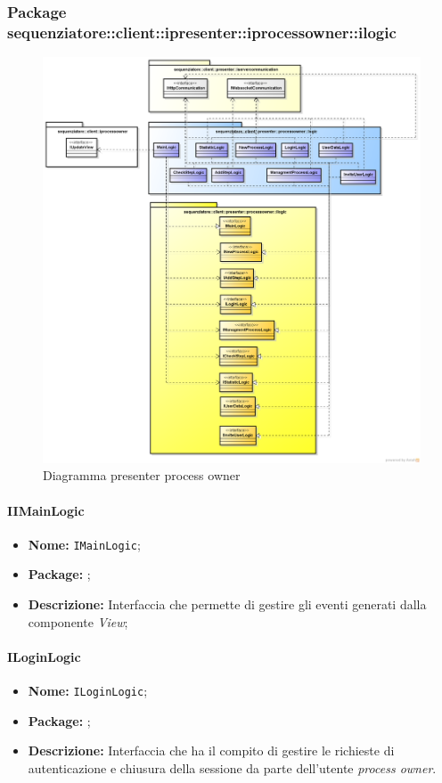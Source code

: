 \subsubsection{Package sequenziatore::client::ipresenter::iprocessowner::ilogic}
\begin{figure}[H] \centering \includegraphics[width=%
\textwidth]
{./pack/presenter_PO.png} \caption{Diagramma presenter process owner}
\end{figure}
\paragraph{IIMainLogic}
\begin{itemize}
\item \textbf{Nome:} \texttt{IMainLogic};
\item \textbf{Package:} \texttt{\iLogicAdmin{}};
\item \textbf{Descrizione:} Interfaccia che permette di gestire gli eventi generati dalla componente \textit{View};
\end{itemize}

\paragraph{ILoginLogic}
\begin{itemize}
\item \textbf{Nome:} \texttt{ILoginLogic};
\item \textbf{Package:} \texttt{\iLogicAdmin{}};
\item \textbf{Descrizione:} Interfaccia che ha il compito di gestire le richieste di autenticazione e chiusura della sessione da parte dell'utente \textit{process owner}.
\end{itemize}

